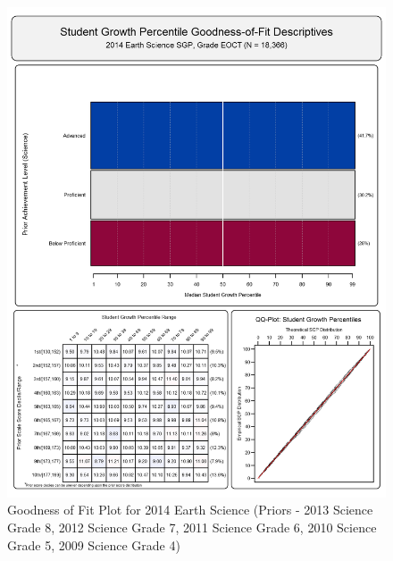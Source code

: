 \documentclass[12pt]{article}
\begin{document}
\begin{figure}[htbp]
\centering
\includegraphics{../img/Goodness_of_Fit/EARTH_SCIENCE.2014/2014_EARTH_SCIENCE_EOCT;2013_SCIENCE_8;2012_SCIENCE_7;2011_SCIENCE_6;2010_SCIENCE_5;2009_SCIENCE_4.png}
\caption{Goodness of Fit Plot for 2014 Earth Science (Priors - 2013
Science Grade 8, 2012 Science Grade 7, 2011 Science Grade 6, 2010
Science Grade 5, 2009 Science Grade 4)}
\end{figure}
\end{document}

